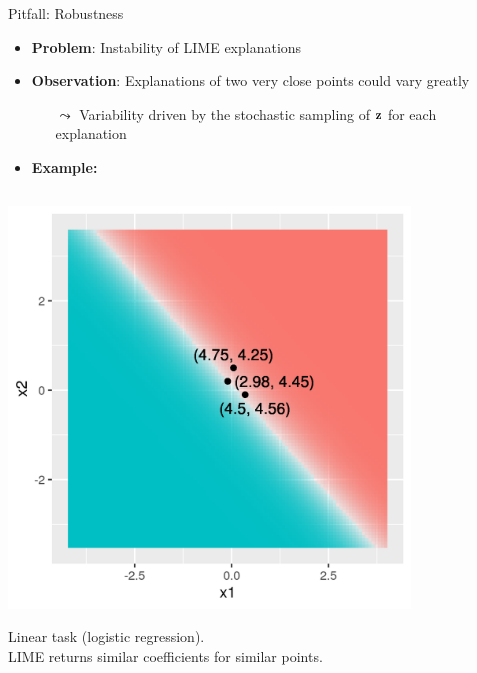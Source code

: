 \documentclass[10pt,compress,t,notes=noshow, xcolor=table]{beamer}
\begin{document}
\begin{frame}{Pitfall: Robustness }
\begin{itemize}
	\item \textbf{Problem}: Instability of LIME explanations 
	\item \textbf{Observation}: Explanations of two very close points could vary greatly 
	\begin{itemize}
	    \item[$\leadsto$] Variability driven by the stochastic sampling of $\mathbf{z}$ for each explanation
	\end{itemize}
    \item \textbf{Example:}
\end{itemize}
\vspace{-0.7cm}
\begin{columns}[totalwidth=\textwidth]
	\begin{column}{0.5\textwidth}
		\begin{center}
		
		\includegraphics[width=0.8\textwidth]{figure/lime_robustness_1.png}
		
		{Linear task (logistic regression). \\
        LIME returns similar coefficients for similar points.}
		

\end{center}
\end{column}
\end{columns}
\end{frame}
\end{document}
